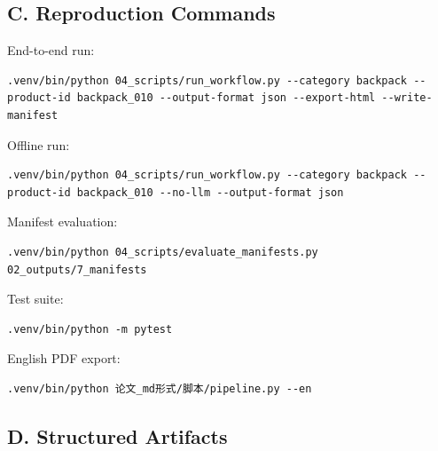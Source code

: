 \documentclass[11pt]{article}
\begin{document}
\subsection{C. Reproduction Commands}

End-to-end run:

\begin{verbatim}
.venv/bin/python 04_scripts/run_workflow.py --category backpack --product-id backpack_010 --output-format json --export-html --write-manifest
\end{verbatim}

Offline run:

\begin{verbatim}
.venv/bin/python 04_scripts/run_workflow.py --category backpack --product-id backpack_010 --no-llm --output-format json
\end{verbatim}

Manifest evaluation:

\begin{verbatim}
.venv/bin/python 04_scripts/evaluate_manifests.py 02_outputs/7_manifests
\end{verbatim}

Test suite:

\begin{verbatim}
.venv/bin/python -m pytest
\end{verbatim}

English PDF export:

\begin{verbatim}
.venv/bin/python 论文_md形式/脚本/pipeline.py --en
\end{verbatim}

\subsection{D. Structured Artifacts}
\end{document}
